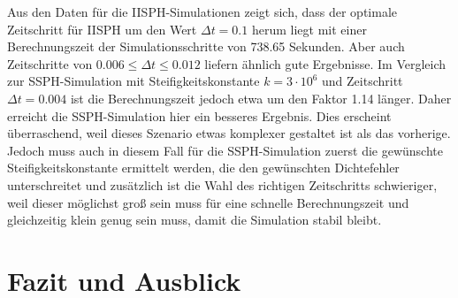 \documentclass[11pt,
a4paper,
parskip=half, %
BCOR=10mm, %
english,
ngerman]{scrreprt}
\begin{document}
Aus den Daten für die IISPH-Simulationen zeigt sich,
dass der optimale Zeitschritt für IISPH um den Wert $\Delta t = 0.1$ herum liegt mit einer Berechnungszeit der Simulationsschritte von 738.65 Sekunden.
Aber auch Zeitschritte von $0.006 \leq \Delta t \leq 0.012$ liefern ähnlich gute Ergebnisse.
Im Vergleich zur SSPH-Simulation mit Steifigkeitskonstante $k = 3 \cdot 10^6$ und Zeitschritt $\Delta t = 0.004$ ist die Berechnungszeit jedoch etwa um den Faktor 1.14 länger.
Daher erreicht die SSPH-Simulation hier ein besseres Ergebnis.
Dies erscheint überraschend, weil dieses Szenario etwas komplexer gestaltet ist als das vorherige.
Jedoch muss auch in diesem Fall für die SSPH-Simulation zuerst die gewünschte Steifigkeitskonstante ermittelt werden,
die den gewünschten Dichtefehler unterschreitet und zusätzlich ist die Wahl des richtigen Zeitschritts schwieriger,
weil dieser möglichst groß sein muss für eine schnelle Berechnungszeit und gleichzeitig klein genug sein muss, damit die Simulation stabil bleibt.

\chapter{Fazit und Ausblick}


\end{document}
